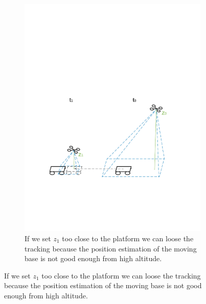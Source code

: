 \begin{figure}[!htbp]
 \centering
   \begin{subfigure}[b]{0.8\textwidth}
     \includegraphics[width=\textwidth]{img/approach_platform_lose.pdf}
        \caption{If we set $z_1$ too close to the platform we can loose the tracking because the position estimation of the moving base is not good enough from high altitude.}
        \label{fig:loose_platform}
   \end{subfigure}
   

\end{figure}
